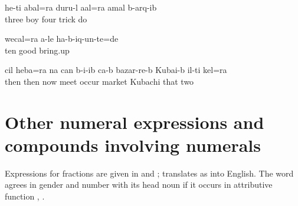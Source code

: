 \ea\label{ex:mythreechildrenallplayedtricks}
\gll	he{\uvfr}-t{\lmk}i	{\eppl}a{\pha}bal=ra	dur{\phfr}u{\pha}-l	a{\vuvfr}{\lab}al=ra	{\eppl}a{\pha}mal	b-arq{\ej}-ib\\
		three	boy	four	trick	do\\
\glt	{}
\z

\ea\label{ex:allchildrenwerebroughtupwell}
\gll	wec{\ej}al=ra	{\eppl}a{\pha}{\phfr}-le	ha-b-iq{\ej}-un-te=de\\
	ten	good	bring.up\\
\glt	{}
\z

\ea\label{ex:thenthesetwoalsometonthemarket}
\gll	c{\ej}il	heba=ra	na	can	b-i{\paaf}-ib ca-b	bazar-re-b	Kuba{\paaf}i-b	il-t{\lmk}i	k{\ej}{\lab}el=ra\\
	then	then	now	meet	occur 	market	Kubachi	that	two\\
\glt	{}
\z



\section{Other numeral expressions and compounds involving numerals}
\label{sec:othernumeralexpressions}

Expressions for fractions are given in  and ;  translates as  into English. The word   agrees in gender and number with its head noun if it occurs in attributive function , .
%
\begin{exe}
	\ex	\label{ex:fractions}
		\TabPositions{12em}
			 \tab {}  \\
			 \tab {}	
\end{exe}

